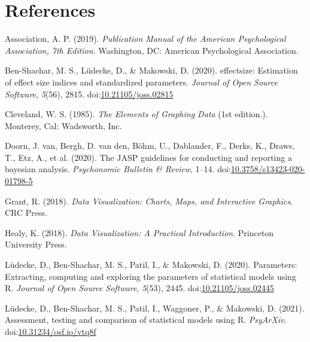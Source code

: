\documentclass[10pt,a4paper,onecolumn]{article}
\newlength{\cslhangindent}
\newenvironment{CSLReferences}[3] %
 {%
  \setlength{\parindent}{0pt}
  \ifodd #1 \everypar{\setlength{\hangindent}{\cslhangindent}}\ignorespaces\fi
  \ifnum #2 > 0
  \setlength{\parskip}{#2\baselineskip}
  \fi
 }%
 {}
\begin{document}
\hypertarget{references}{%
\section*{References}\label{references}}

\hypertarget{refs}{}
\begin{CSLReferences}{1}{0}
\leavevmode{}%
Association, A. P. (2019). \emph{Publication {Manual} of the {American
Psychological Association}, 7th {Edition}}. {Washington, DC}: {American
Psychological Association}.

\leavevmode{}%
Ben-Shachar, M. S., Lüdecke, D., \& Makowski, D. (2020). {e}ffectsize:
Estimation of effect size indices and standardized parameters.
\emph{Journal of Open Source Software}, \emph{5}(56), 2815.
doi:\href{https://doi.org/10.21105/joss.02815}{10.21105/joss.02815}

\leavevmode{}%
Cleveland, W. S. (1985). \emph{The {Elements} of {Graphing Data}} (1st
edition.). {Monterey, Cal}: {Wadsworth, Inc.}

\leavevmode{}%
Doorn, J. van, Bergh, D. van den, Böhm, U., Dablander, F., Derks, K.,
Draws, T., Etz, A., et al. (2020). The JASP guidelines for conducting
and reporting a bayesian analysis. \emph{Psychonomic Bulletin \&
Review}, 1--14.
doi:\href{https://doi.org/10.3758/s13423-020-01798-5}{10.3758/s13423-020-01798-5}

\leavevmode{}%
Grant, R. (2018). \emph{{Data Visualization: Charts, Maps, and
Interactive Graphics}}. CRC Press.

\leavevmode{}%
Healy, K. (2018). \emph{{Data Visualization: A Practical Introduction}}.
Princeton University Press.

\leavevmode{}%
Lüdecke, D., Ben-Shachar, M. S., Patil, I., \& Makowski, D. (2020).
Parameters: Extracting, computing and exploring the parameters of
statistical models using {R}. \emph{Journal of Open Source Software},
\emph{5}(53), 2445.
doi:\href{https://doi.org/10.21105/joss.02445}{10.21105/joss.02445}

\leavevmode{}%
Lüdecke, D., Ben-Shachar, M. S., Patil, I., Waggoner, P., \& Makowski,
D. (2021). Assessment, testing and comparison of statistical models
using {R}. \emph{PsyArXiv}.
doi:\href{https://doi.org/10.31234/osf.io/vtq8f}{10.31234/osf.io/vtq8f}


\end{CSLReferences}
\end{document}
